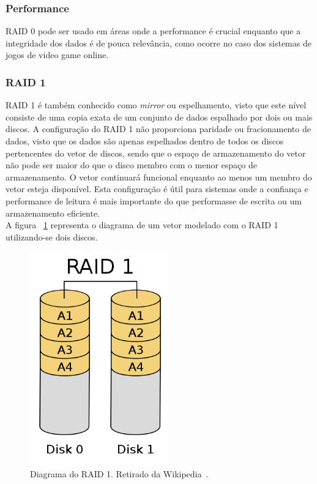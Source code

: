 		\subsubsection{Performance}
		
		RAID 0 pode ser usado em áreas onde a performance é crucial enquanto que a integridade dos dados é de pouca relevância, como ocorre no caso dos sistemas de jogos de video game online.\\
		
		\subsubsection{RAID 1}
		
		RAID 1 é também conhecido como \textit{mirror} ou espelhamento, visto que este nível consiste de uma copia exata de um conjunto de dados espalhado por dois ou mais discos. A configuração do RAID 1 não proporciona paridade ou fracionamento de dados, visto que os dados são apenas espelhados dentro de todos os discos pertencentes do vetor de discos, sendo que o espaço de armazenamento do vetor não pode ser maior do que o disco membro com o menor espaço de armazenamento. O vetor continuará funcional enquanto ao menos um membro do vetor esteja disponível. Esta configuração é útil para sistemas onde a confiança e performance de leitura é mais importante do que performasse de escrita ou um armazenamento eficiente. \\
		
		A figura ~\ref{fig:raid1} representa o diagrama de um vetor modelado com o RAID 1 utilizando-se dois discos.\\
		
		\begin{figure}[htb]
			\begin{center}
				
				\includegraphics[clip,width=6.0cm]{images/RAID_1.png}
				\caption{Diagrama do RAID 1. Retirado da Wikipedia~\citep{wikiRAIDlevels}.}
				\label{fig:raid1}
			\end{center}
		\end{figure} 
		
